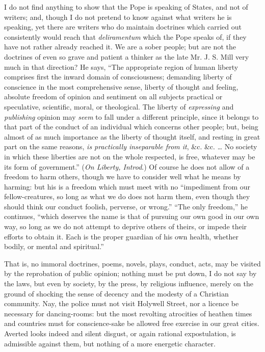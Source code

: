 I do not find anything to show that the Pope is speaking of States,
and not of writers; and, though I do not pretend to know against
what writers he is speaking, yet there are writers who do maintain
doctrines which carried out consistently would reach that \emph{deliramentum}
which the Pope speaks of, if they have not rather already reached it. We
are a sober people; but are not the doctrines of even so grave and
patient a thinker as the late Mr. J. S. Mill very much in that
direction? He says, ``The appropriate region of human liberty
comprises first the inward domain of consciousness; demanding liberty of
conscience in the most comprehensive sense, liberty of thought and
feeling, absolute freedom of opinion and sentiment on all subjects
practical or speculative, scientific, moral, or theological. The liberty
of \emph{expressing} and \emph{publishing} opinion may \emph{seem} to fall
under a different principle, since it belongs to that part of the
conduct of an individual which concerns other people; but, being almost
of as much importance as the liberty of thought itself, and resting in
great part on the same reasons, \emph{is practically inseparable from it},
\&c. \&c. … No society in which these liberties are not on the
whole respected, is free, whatever may be its form of government.''
(\emph{On Liberty, Introd}.) Of course he does not allow of a freedom to
harm others, though we have to consider well what he means by harming:
but his is a freedom which must meet with no ``impediment from our
fellow-creatures, so long as what we do does not harm them, even though
they should think our conduct foolish, perverse, or wrong.''
``The only freedom,'' he continues, ``which deserves the
name is that of pursuing our own good in our own way, so long as we do
not attempt to deprive others of theirs, or impede their efforts
to obtain it. Each is the proper guardian of his own health, whether
bodily, or mental and spiritual.''

That is, no immoral doctrines, poems, novels, plays, conduct, acts,
may be visited by the reprobation of public opinion; nothing must be put
down, I do not say by the laws, but even by society, by the press, by
religious influence, merely on the ground of shocking the sense of
decency and the modesty of a Christian community. Nay, the police must
not visit Holywell Street, nor a licence be necessary for dancing-rooms:
but the most revolting atrocities of heathen times and countries must
for conscience-sake be allowed free exercise in our great cities.
Averted looks indeed and silent disgust, or again rational
expostulation, is admissible against them, but nothing of a more
energetic character.

